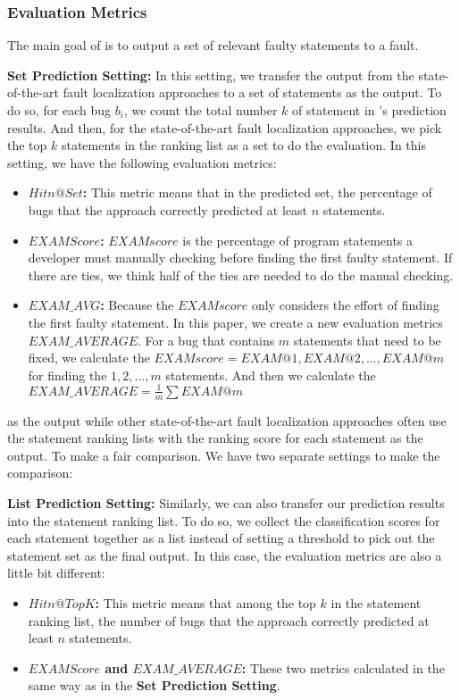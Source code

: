 \subsubsection{Evaluation Metrics}

The main goal of {\tool} is to output a set of relevant faulty statements to a fault. 



{\bf Set Prediction Setting:} In this setting, we transfer the output from the state-of-the-art fault localization approaches to a set of statements as the output. To do so, for each bug $b_i$, we count the total number $k$ of statement in \tool's prediction results. And then, for the state-of-the-art fault localization approaches, we pick the top $k$ statements in the ranking list as a set to do the evaluation. In this setting, we have the following evaluation metrics:

\begin{itemize}
	\item {\bf $Hit n @Set$:} This metric means that in the predicted set, the percentage of bugs that the approach correctly predicted at least $n$ statements.
	\item {\bf $EXAM Score$\cite{wong2008crosstab}:} $EXAM score$ is the percentage of program statements a developer must manually checking before finding the first faulty statement. If there are ties, we think half of the ties are needed to do the manual checking.
	\item{\bf $EXAM\_AVG$:} Because the $EXAM score$ only considers the effort of finding the first faulty statement. In this paper, we create a new evaluation metrics $EXAM\_AVERAGE$. For a bug that contains $m$ statements that need to be fixed, we calculate the $EXAM score = {EXAM@1, EXAM@2, ..., EXAM@m}$ for finding the $1, 2, ..., m$ statements. And then we calculate the $EXAM\_AVERAGE = \frac{1}{m}\sum EXAM@m$
\end{itemize}




as the output while other state-of-the-art fault localization approaches often use the statement ranking lists with the ranking score for each statement as the output. To make a fair comparison. 
We have two separate settings to make the comparison:

{\bf List Prediction Setting:} Similarly, we can also transfer our prediction results into the statement ranking list. To do so, we collect the classification scores for each statement together as a list instead of setting a threshold to pick out the statement set as the final output. In this case, the evaluation metrics are also a little bit different:

\begin{itemize}
	\item {\bf $Hit n @ Top K$:} This metric means that among the top $k$ in the statement ranking list, the number of bugs that the approach correctly predicted at least $n$ statements.
	\item {\bf $EXAM Score$\cite{wong2008crosstab} and $EXAM\_AVERAGE$:} These two metrics calculated in the same way as in the {\bf Set Prediction Setting}.
\end{itemize}
